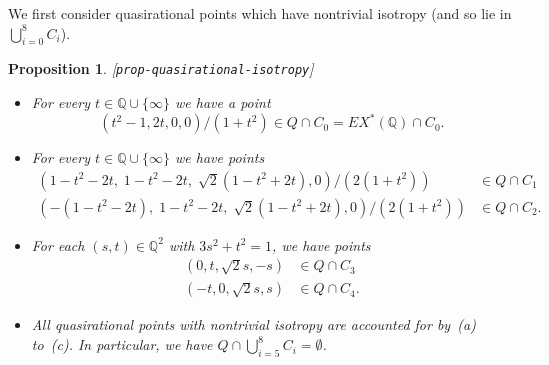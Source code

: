 \documentclass[reqno]{amsart}
\newcommand{\lbl}[1]{\label{#1}\textup{[\texttt{#1}]}\par}
\newcommand{\lbl}{\label}
\newcommand{\Q}         {{\mathbb{Q}}}
\newcommand{\rt}        {\sqrt{2}}
\renewcommand{\:}{\colon}
\newtheorem{proposition}[theorem]{Proposition}
\theoremstyle{definition}
\begin{document}
We first consider quasirational points which have nontrivial isotropy
(and so lie in $\bigcup_{i=0}^8C_i$).
\begin{proposition}\lbl{prop-quasirational-isotropy}
 \begin{itemize}
  \item[(a)] For every $t\in\Q\cup\{\infty\}$ we have a point
   \[ \left(t^2-1,2t,0,0\right)/(1+t^2) \in Q\cap C_0 = EX^*(\Q)\cap C_0. \]
  \item[(b)] For every $t\in\Q\cup\{\infty\}$ we have points
   \begin{align*}
    \left(1-t^2-2t,\;1-t^2-2t,\;\rt(1-t^2+2t),0\right)/(2(1+t^2))
       & \in Q\cap C_1 \\
    \left(-(1-t^2-2t),\;1-t^2-2t,\;\rt(1-t^2+2t),0\right)/(2(1+t^2))
       & \in Q\cap C_2.
   \end{align*}
  \item[(c)] For each $(s,t)\in\Q^2$ with $3s^2+t^2=1$, we have points
   \begin{align*}
    \left(0,t,\rt s,-s\right) &\in Q\cap C_3 \\
    \left(-t,0,\rt s,s\right) &\in Q\cap C_4.
   \end{align*}
  \item[(d)] All  quasirational points with nontrivial isotropy are
   accounted for by~(a) to~(c).  In particular, we have
   $Q\cap\bigcup_{i=5}^8C_i=\emptyset$.
 \end{itemize}
\end{proposition}
\end{document}
